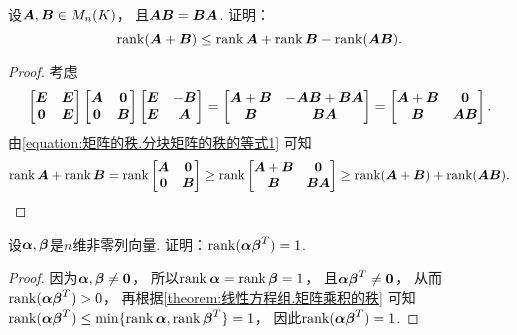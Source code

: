 \begin{example}\label{example:矩阵乘积的秩.可交换矩阵之和的秩}
设\(\boldsymbol{A},\boldsymbol{B}\in M_n(K)\)，
且\(\boldsymbol{A} \boldsymbol{B}=\boldsymbol{B}\boldsymbol{A}\).
证明：\begin{equation*}
	\rank(\boldsymbol{A}+\boldsymbol{B})\leq\rank\boldsymbol{A}+\rank\boldsymbol{B}-\rank(\boldsymbol{A} \boldsymbol{B}).
\end{equation*}
\begin{proof}
考虑\begin{equation*}
	\begin{bmatrix}
		\boldsymbol{E} & \boldsymbol{E} \\
		\boldsymbol0 & \boldsymbol{E}
	\end{bmatrix}
	\begin{bmatrix}
		\boldsymbol{A} & \boldsymbol0 \\
		\boldsymbol0 & \boldsymbol{B}
	\end{bmatrix}
	\begin{bmatrix}
		\boldsymbol{E} & -\boldsymbol{B} \\
		\boldsymbol{E} & \boldsymbol{A}
	\end{bmatrix}
	= \begin{bmatrix}
		\boldsymbol{A}+\boldsymbol{B} & -\boldsymbol{A} \boldsymbol{B}+\boldsymbol{B}\boldsymbol{A} \\
		\boldsymbol{B} & \boldsymbol{B}\boldsymbol{A}
	\end{bmatrix}
	= \begin{bmatrix}
		\boldsymbol{A}+\boldsymbol{B} & \boldsymbol0 \\
		\boldsymbol{B} & \boldsymbol{A} \boldsymbol{B}
	\end{bmatrix}.
\end{equation*}
由\cref{equation:矩阵的秩.分块矩阵的秩的等式1} 可知\begin{equation*}
	\rank\boldsymbol{A}+\rank\boldsymbol{B}
	= \rank\begin{bmatrix}
		\boldsymbol{A} & \boldsymbol0 \\
		\boldsymbol0 & \boldsymbol{B}
	\end{bmatrix}
	\geq \rank\begin{bmatrix}
		\boldsymbol{A}+\boldsymbol{B} & \boldsymbol0 \\
		\boldsymbol{B} & \boldsymbol{B}\boldsymbol{A}
	\end{bmatrix}
	\geq \rank(\boldsymbol{A}+\boldsymbol{B}) + \rank(\boldsymbol{A} \boldsymbol{B}).
	\qedhere
\end{equation*}
\end{proof}
\end{example}

\begin{example}\label{example:矩阵乘积的秩.两个向量的乘积的秩}
设\(\boldsymbol\alpha,\boldsymbol\beta\)是\(n\)维非零列向量.
证明：\(\rank(\boldsymbol\alpha\boldsymbol\beta^T)=1\).
\begin{proof}
因为\(\boldsymbol\alpha,\boldsymbol\beta\neq\boldsymbol0\)，
所以\(\rank\boldsymbol\alpha=\rank\boldsymbol\beta=1\)，
且\(\boldsymbol\alpha\boldsymbol\beta^T\neq\boldsymbol0\)，
从而\(\rank(\boldsymbol\alpha\boldsymbol\beta^T)>0\)，
再根据\cref{theorem:线性方程组.矩阵乘积的秩} 可知
\(\rank(\boldsymbol\alpha\boldsymbol\beta^T)
\leq \min\{\rank\boldsymbol\alpha,\rank\boldsymbol\beta^T\}
= 1\)，
因此\(\rank(\boldsymbol\alpha\boldsymbol\beta^T)=1\).
\end{proof}
\end{example}

